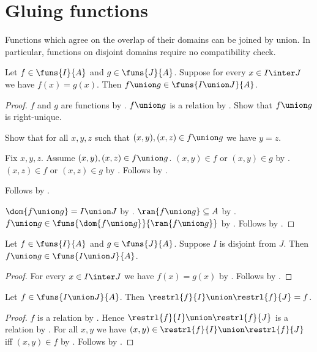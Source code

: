 \section{Gluing functions}



Functions which agree on the overlap of their domains can be joined by union.
In particular, functions on disjoint domains require no compatibility check.

\begin{theorem}\label{compatible_function_union_type}
    Let $f\in\funs{I}{A}$ and $g\in\funs{J}{A}$.
    Suppose for every $x\in I\inter J$ we have $f(x)=g(x)$.
    Then $f\union g\in\funs{I\union J}{A}$.
\end{theorem}
\begin{proof}
    $f$ and $g$ are functions by .
    $f\union g$ is a relation by .
    Show that $f\union g$ is right-unique.
    \begin{subproof}
        Show that for all $x,y,z$ such that $(x,y),(x,z)\in f\union g$ we have $y=z$.
        \begin{subproof}
            Fix $x,y,z$.
            Assume $(x,y),(x,z)\in f\union g$.
            $(x,y)\in f$ or $(x,y)\in g$ by .
            $(x,z)\in f$ or $(x,z)\in g$ by .
            Follows by .
        \end{subproof}
        Follows by .
    \end{subproof}
    $\dom{f\union g}=I\union J$ by .
    $\ran{f\union g}\subseteq A$ by .
    $f\union g\in\funs{\dom{f\union g}}{\ran{f\union g}}$ by
        .
    Follows by .
\end{proof}

\begin{corollary}\label{disjoint_function_union_type}
    Let $f\in\funs{I}{A}$ and $g\in\funs{J}{A}$.
    Suppose $I$ is disjoint from $J$.
    Then $f\union g\in\funs{I\union J}{A}$.
\end{corollary}
\begin{proof}
    For every $x\in I\inter J$ we have $f(x)=g(x)$ by .
    Follows by .
\end{proof}

\begin{proposition}\label{function_union_restrictions}
    Let $f\in\funs{I\union J}{A}$.
    Then $\restrl{f}{I}\union\restrl{f}{J}=f$.
\end{proposition}
\begin{proof}
    $f$ is a relation by .
    Hence $\restrl{f}{I}\union\restrl{f}{J}$ is a relation by
        .
    For all $x,y$ we have $(x,y)\in\restrl{f}{I}\union\restrl{f}{J}$ iff
        $(x,y)\in f$ by .
    Follows by .
\end{proof}
